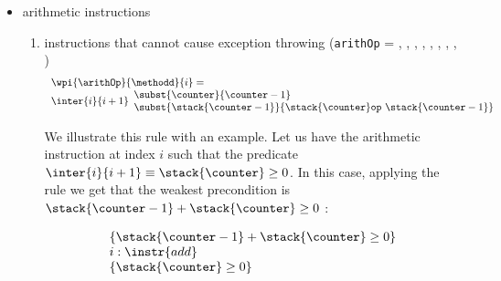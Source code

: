 \begin{itemize}
\item arithmetic instructions
	\begin{enumerate}
		\item instructions that cannot  cause exception throwing    (\texttt{arithOp} =  , , , 
				, ,  , , ,     )\\
				$$ \begin{array}{l} 
                                          \wpi{\arithOp }{\methodd} {i}    =  \\
					  \inter{i}{i+1}
                                          \begin{array}{l}
                                                \subst{\counter}{\counter   - 1} \\
                                                \subst{ \stack{\counter - 1} } {  \stack{\counter}   \texttt{op} \ \stack{\counter -1} }
				          \end{array}
                                     \end{array} $$

				We illustrate this rule with an example. Let us have  the arithmetic instruction   at index $i$ such that the predicate
				$\inter{i}{i+1} \equiv \stack{\counter } \geq 0 $. In this case, applying the rule we get that the weakest precondition 
				is $\stack{\counter - 1} +  \stack{\counter } \geq 0$ :
				
				$$
				\begin{array}{l}
				 \{ \stack{\counter - 1} +  \stack{\counter } \geq 0 \}   \\
				   i : \instr{add} \\
				   \{ \stack{\counter } \geq 0 \} 
				 \end{array}
				$$
				

\end{enumerate}
\end{itemize}
